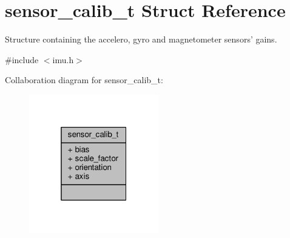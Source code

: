 \hypertarget{structsensor__calib__t}{\section{sensor\+\_\+calib\+\_\+t Struct Reference}
\label{structsensor__calib__t}
}


Structure containing the accelero, gyro and magnetometer sensors' gains.  




{\ttfamily \#include $<$imu.\+h$>$}



Collaboration diagram for sensor\+\_\+calib\+\_\+t\+:
\nopagebreak
\begin{figure}[H]
\begin{center}
\leavevmode
\includegraphics[width=160pt]{structsensor__calib__t__coll__graph}
\end{center}
\end{figure}
